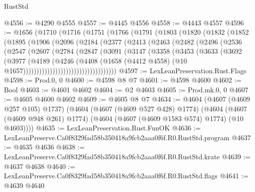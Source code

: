 \begin{lexlean}{RustStd}
\begin{coremodule}
@4556 := @4290 @4555
@4557 := @4445 @4556
@4558 := @4443 @4557
@4596 := @1656
    (@1710
      (@1716
        (@1751
          (@1766
            (@1791
              (@1803
                (@1820
                  (@1832
                    (@1852
                      (@1895
                        (@1906
                          (@2096
                            (@2184
                              (@2377
                                (@2413
                                  (@2463
                                    (@2482
                                      (@2496
                                        (@2536
                                          (@2547
                                            (@2607
                                              (@2784
                                                (@2847
                                                  (@3091
                                                    (@3147
                                                      (@3358
                                                        (@3453
                                                          (@3633
                                                            (@3692
                                                              (@3977
                                                                (@4189
                                                                  (@4246
                                                                    (@4408
                                                                      (@1658
                                                                        (@4412 @4558)
                                                                        (@10
                                                                          @1657)))))))))))))))))))))))))))))))))))
@4597 := LexLeanPreservation.Rust.Flags
@4598 := Prod.{0, 0}
@4600 := @4598 @8 @7
@4601 := @4598 @4600
@4602 := Bool
@4603 := @4601 @4602
@4604 := @2 @4603
@4605 := Prod.mk.{0, 0}
@4607 := @4605 @4600 @4602
@4609 := @4605 @8 @7
@4634 := @4604
    (@4607 (@4609 @257 @105) @1737)
    (@4604
      (@4607 (@4609 @527 @428) @1774)
      (@4604 (@4607 (@4609 @948 @261) @1774) (@4604 (@4607 (@4609 @1583 @574) @1774) (@10 @4603))))
@4635 := LexLeanPreservation.Rust.FunOK
@4636 := LexLeanPreserve.Ca0f8329fad58b350418a9fcb2aaa0f6f.R0.RustStd.program
@4637 := @4635 @4636
@4638 := LexLeanPreserve.Ca0f8329fad58b350418a9fcb2aaa0f6f.R0.RustStd.krate
@4639 := @4637 @4638
@4640 := LexLeanPreserve.Ca0f8329fad58b350418a9fcb2aaa0f6f.R0.RustStd.flags
@4641 := @4639 @4640

\end{coremodule}
\end{lexlean}
